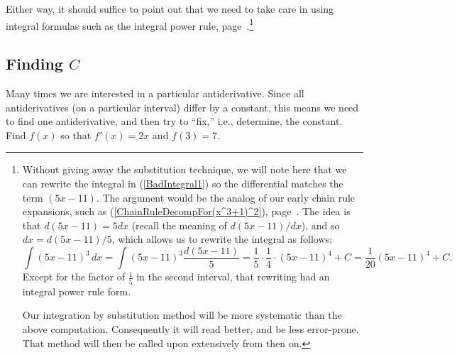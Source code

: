 Either way, it should suffice to 
point out that we need to take care in using integral formulas
such as the integral power rule,
page~\pageref{IntegralPowerRule}.\footnote{%
Without giving away the substitution technique, we will note here
that we can rewrite the integral in (\ref{BadIntegral1})
so the differential matches the term $(5x-11)$.  The argument
would be the analog of our early chain rule expansions, such as
(\ref{ChainRuleDecompFor(x^3+1)^2}), 
page~\pageref{ChainRuleDecompFor(x^3+1)^2}.
The idea is that $d(5x-11)=5dx$ (recall the meaning of $d(5x-11)/dx$),
and so $dx=d(5x-11)/5$, which allows us to rewrite the integral
as follows:
$$\int(5x-11)^3\,dx=\int(5x-11)^3\frac{d(5x-11)}{5}
  =\frac15\cdot\frac14\cdot(5x-11)^4+C=\frac1{20}(5x-11)^4+C.$$
Except for the factor of $\frac15$ in the second interval, 
that rewriting had an integral power rule form.

Our integration by substitution method will be more systematic
than the above computation.  Consequently it will read
better, and be less error-prone.  That method
will then be  called upon extensively from then on.}
 




\subsection{Finding $C$}
Many times we are interested in a particular antiderivative.
Since all antiderivatives (on a particular interval) differ
by a constant, this means we need to find one antiderivative,
and then try to ``fix,'' i.e., determine, the  constant.  
\bex Find $f(x)$ so that $f'(x)=2x$ and $f(3)=7$.

